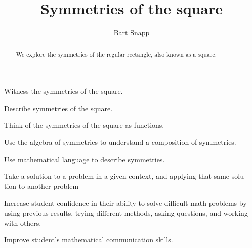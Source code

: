 \documentclass[noauthor,nooutcomes,hints,handout]{ximera}
\title{Symmetries of the square}
\author{Bart Snapp}
\begin{document}
\begin{abstract}
  We explore the symmetries of the regular rectangle, also known as a
  square.
\end{abstract}
\maketitle

\begin{listOutcomes}
\item Witness the symmetries of the square.
\item Describe symmetries of the square.
\item Think of the symmetries of the square as functions.
\item Use the algebra of symmetries to understand a composition of
  symmetries.
\end{listOutcomes}


\begin{listObjectives}
 \item Use mathematical language to describe symmetries.
 \item Take a solution to a problem in a given context, and applying that same solu- tion to another problem
 \item Increase student confidence in their ability to solve difficult math problems by using previous results, trying different methods, asking questions, and working with others.
\item Improve student’s mathematical communication skills.
\end{listObjectives}
\mynewpage
\end{document}
